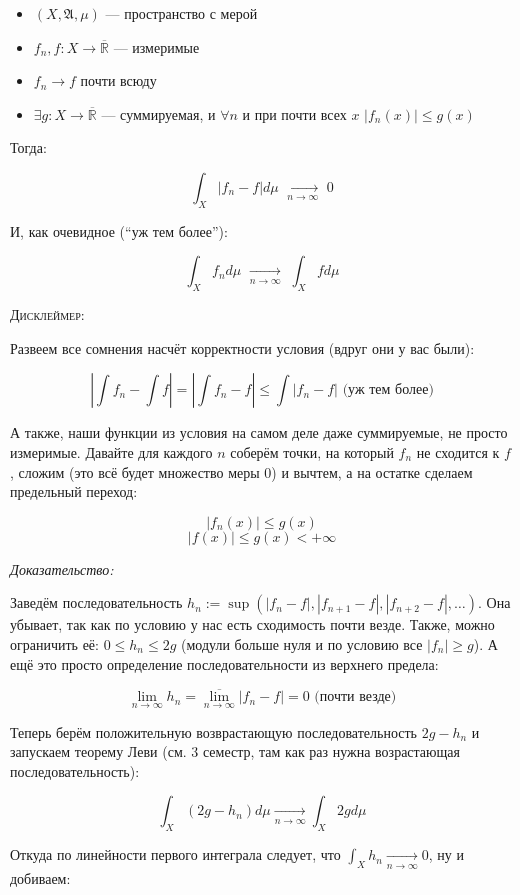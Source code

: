 \documentclass{article}
\def\dbl{\,\,}
\def\rinf{\overline{\mathbb{R}}}
\def\goesto#1{\underset{#1}{\longrightarrow}}
\def\toinf#1{\goesto{#1 \rightarrow \infty}}
\def\ntoinf{\toinf{n}}
\begin{document}
\begin{itemize}
    \item $(X, \mathfrak{A}, \mu)$ --- пространство с мерой
    \item $f_n, f: X \rightarrow \rinf$ --- измеримые
    \item $f_n \rightarrow f$ почти всюду
    \item $\exists g: X \rightarrow \rinf$ --- суммируемая, и $\forall n$ и при почти всех $x \dbl |f_n(x)| \le g(x)$
\end{itemize}

Тогда:

\[\int_{X}|f_n - f| d \mu \dbl \ntoinf \dbl 0\]

И, как очевидное (``уж тем более''):

\[\int_{X} f_n d\mu \dbl \ntoinf \dbl \int_{X} f d\mu\]


\textsc{Дисклеймер:}

Развеем все сомнения насчёт корректности условия (вдруг они у вас были):

\[\left| \int f_n - \int f \right| = \left| \int f_n - f \right| \le \int |f_n - f| \text{ (уж тем более)}\]

А также, наши функции из условия на самом деле даже суммируемые, не просто измеримые. Давайте для каждого $n$ соберём точки, на который $f_n$ не сходится к $f$, сложим (это всё будет множество меры 0) и вычтем, а на остатке сделаем предельный переход:

\[|f_n(x)| \le g(x)\]
\[|f(x)| \le g(x) < +\infty\]

\textit{Доказательство:}

Заведём последовательность $h_n := \sup (|f_n - f|, |f_{n + 1} - f|, |f_{n + 2} - f|, \ldots)$. Она убывает, так как по условию у нас есть сходимость почти везде. Также, можно ограничить её: $0 \le h_n \le 2 g$ (модули больше нуля и по условию все $|f_n| \ge g$). А ещё это просто определение последовательности из верхнего предела:

\[\lim_{n \rightarrow \infty} h_n = \overline{\lim_{n \rightarrow \infty}} |f_n - f| = 0 \text{ (почти везде)}\]

Теперь берём положительную возврастающую последовательность $2g - h_n$ и запускаем теорему Леви (см. 3 семестр, там как раз нужна возрастающая последовательность):

\[\int_{X} (2g - h_n) d\mu \ntoinf \int_{X} 2g d\mu\]

Откуда по линейности первого интеграла следует, что $\int_{X} h_n \ntoinf 0$, ну и добиваем:
\end{document}
